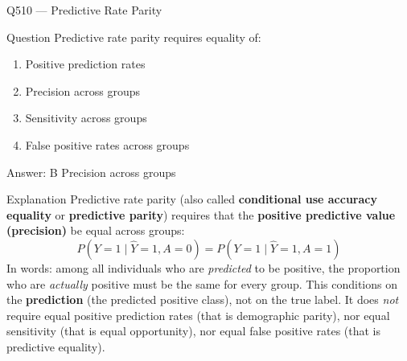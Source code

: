 \documentclass[aspectratio=169,8pt]{beamer}
\begin{document}
\begin{frame}{Q510 --- Predictive Rate Parity}
	\begin{block}{Question}
		Predictive rate parity requires equality of:
		\begin{enumerate}
			\item Positive prediction rates
			\item Precision across groups
			\item Sensitivity across groups
			\item False positive rates across groups
		\end{enumerate}
	\end{block}
	\begin{exampleblock}{Answer: B}
		Precision across groups
	\end{exampleblock}
	\begin{block}{Explanation}
		Predictive rate parity (also called \textbf{conditional use accuracy equality} or
		\textbf{predictive parity}) requires that the \textbf{positive predictive value (precision)}
		be equal across groups:
		\[
		P(Y = 1 \mid \hat{Y} = 1, A = 0) = P(Y = 1 \mid \hat{Y} = 1, A = 1)
		\]
		In words: among all individuals who are \emph{predicted} to be positive,
		the proportion who are \emph{actually} positive must be the same for every group.
		This conditions on the \textbf{prediction} (the predicted positive class), not on the
		true label. It does \emph{not} require equal positive prediction rates
		(that is demographic parity), nor equal sensitivity (that is equal opportunity),
		nor equal false positive rates (that is predictive equality).
	\end{block}
\end{frame}
\end{document}
